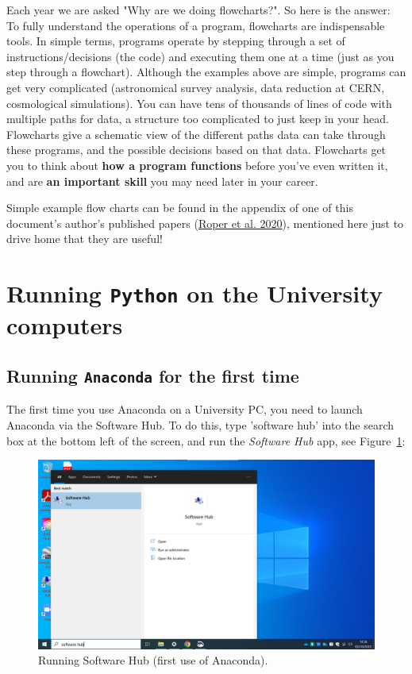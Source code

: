 Each year we are asked "Why are we doing flowcharts?". So here is the answer: To fully understand the operations of a program, flowcharts are indispensable tools. In simple terms, programs operate by stepping through a set of instructions/decisions (the code) and executing them one at a time (just as you step through a flowchart). Although the examples above are simple, programs can get very complicated (astronomical survey analysis, data reduction at CERN, cosmological simulations). You can have tens of thousands of lines of code with multiple paths for data, a structure too complicated to just keep in your head. Flowcharts give a schematic view of the different paths data can take through these programs, and the possible decisions based on that data. Flowcharts get you to think about \textbf{how a program functions} before you've even written it, and are \textbf{an important skill} you may need later in your career. 

Simple example flow charts can be found in the appendix of one of this document's author's published papers (\href{https://arxiv.org/abs/2003.01187}{Roper et al. 2020}), mentioned here just to drive home that they are useful!

\section{Running \texttt{Python} on the University computers}
\label{StartingPython}

\subsection{Running \texttt{Anaconda} for the first time}

The first time you use Anaconda on a University PC, you need to launch Anaconda via the Software Hub.
To do this, type 'software hub' into the search box at the bottom left of the screen, and run the {\em Software Hub} app, see Figure~\ref{fig:software_hub}:

\begin{figure}[htbp]  
\centering
\includegraphics[width=12cm]{Figures/software_hub.png}
\caption{Running Software Hub (first use of Anaconda).}
\label{fig:software_hub}
\end{figure}

